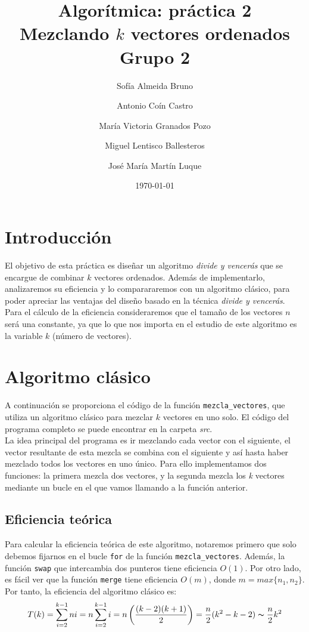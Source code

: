 \documentclass[11pt]{article}
\title{Algorítmica: práctica 2 \\ \large Mezclando $k$ vectores ordenados\\ \vspace{0.2em}Grupo 2}
\author{Sofía Almeida Bruno \and Antonio Coín Castro \and María Victoria Granados Pozo \and Miguel Lentisco Ballesteros \and José María Martín Luque}
\date{\today}
\begin{document}
\maketitle

\newpage

\section*{Introducción}

El objetivo de esta práctica es diseñar un algoritmo \textit{divide y vencerás}
que se encargue de combinar $k$ vectores ordenados. Además de implementarlo, analizaremos su eficiencia y lo comparararemos con un algoritmo clásico, para poder apreciar las ventajas del diseño basado en la técnica \textit{divide y vencerás}. Para el cálculo de la eficiencia consideraremos que el tamaño de los vectores $n$ será una constante, ya que lo que nos importa en el estudio de este algoritmo es la variable $k$ (número de vectores).

\section*{Algoritmo clásico}

A continuación se proporciona el código de la función \texttt{mezcla\_vectores},
que utiliza un algoritmo clásico para mezclar $k$ vectores en uno solo. El
código del programa completo se puede encontrar en la carpeta \textit{src}.\\
La idea principal del programa es ir mezclando cada vector con el siguiente, el vector resultante de esta mezcla se combina con el siguiente y así hasta haber mezclado todos los vectores en uno único. Para ello implementamos dos funciones: la primera mezcla dos vectores, y la segunda mezcla los \textit{k} vectores mediante un bucle en el que vamos llamando a la función anterior.\\


\subsection*{Eficiencia teórica}

Para calcular la eficiencia teórica de este algoritmo, notaremos primero que solo debemos fijarnos en el bucle \verb|for| de la función \verb|mezcla_vectores|. Además, la función \verb|swap| que intercambia dos punteros tiene eficiencia $O(1)$. Por otro lado, es fácil ver que la función \verb|merge| tiene eficiencia $O(m)$, donde $m = max\{n_1, n_2\}$. Por tanto, la eficiencia del algoritmo clásico es: $$T(k) = \sum_{i=2}^{k-1} ni = n \sum_{i=2}^{k-1} i = n \left( \frac{(k-2)(k+1)}{2} \right) = \frac{n}{2}(k^2 -k - 2) \thicksim \frac{n}{2}k^2$$
\end{document}
